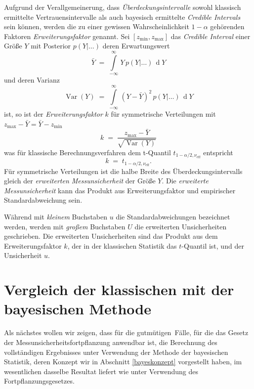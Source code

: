 Aufgrund der Verallgemeinerung, dass \textsl{Überdeckungsintervalle} sowohl
klassisch ermittelte Vertrauensintervalle als auch bayesisch ermittelte
\textsl{Credible Intervals} sein können,
werden die zu einer gewissen Wahrscheinlichkeit $1-\alpha$ gehörenden Faktoren
\textsl{Erweiterungsfaktor} genannt. Sei  $[z_\mathrm{min}, z_\mathrm{max}]$
das \textsl{Credible Interval}
einer Größe $Y$ mit Posterior $p(Y |\dots)$ deren Erwartungswert
\begin{equation}
\bar Y \; = \; \int\limits_{-\infty}^\infty \, Y \, p(Y |\dots) \, \operatorname{d}Y
\end{equation}
und deren Varianz
\begin{equation}
\operatorname{Var}(Y) \; = \; \int\limits_{-\infty}^\infty \, (Y - \bar Y)^2 \, p(Y |\dots) \, \operatorname{d}Y
\end{equation}
ist, so ist der \textsl{Erweiterungsfaktor} $k$ für symmetrische Verteilungen mit
$z_\mathrm{max} - \bar Y = \bar Y - z_\mathrm{min}$
\begin{equation}
k \; = \; \frac{z_\mathrm{max} - \bar Y}{\sqrt{\operatorname{Var}(Y)}}
\end{equation}
was für klassische Berechnungsverfahren dem 
t-Quantil $t_{1-\alpha/2,\nu_\mathrm{eff}}$ entspricht
\begin{equation}
k \; = \; t_{1-\alpha/2,\nu_\mathrm{eff}} .
\end{equation}
Für symmetrische Verteilungen ist die halbe Breite des Überdeckungsintervalls
gleich der \textsl{erweiterten Messunsicherheit} der Größe $Y$. Die
\textsl{erweiterte Messunsicherheit} kann das Produkt aus
Erweiterungsfaktor und empirischer Standardabweichung sein.

Während mit \textsl{kleinem} Buchstaben $u$ die Standardabweichungen bezeichnet werden,
werden mit \textsl{großem} Buchstaben $U$ die erweiterten Unsicherheiten geschrieben. Die
erweiterten Unsicherheiten sind das Produkt aus
dem Erweiterungsfaktor $k$, der in der klassischen Statistik das $t$-Quantil ist, 
und der Unsicherheit $u$.

\section{Vergleich der klassischen mit der bayesischen Methode}
\label{MUFklassischvsbayes}

Als nächstes wollen wir zeigen, dass für die \glqq gutmütigen\grqq ~Fälle, für die das
Gesetz der Mess\-un\-sicher\-heits\-fort\-pflanz\-ung anwendbar ist, die Berechnung des vollständigen
Ergebnisses unter Verwendung der Methode der bayesischen Statistik, deren Konzept wir in
Abschnitt \ref{bayeskonzept} vorgestellt haben, im wesentlichen dasselbe
Resultat liefert wie unter Verwendung des Fort\-pflanz\-ungs\-gesetzes.

